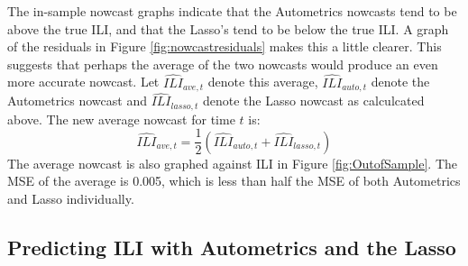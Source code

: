 The in-sample nowcast graphs indicate that the Autometrics nowcasts tend to be above the true ILI, and that the Lasso's tend to be below the true ILI. A graph of the residuals in Figure \ref{fig:nowcastresiduals} makes this a little clearer. This suggests that perhaps the average of the two nowcasts would produce an even more accurate nowcast. Let $\widehat{ILI}_{ave, t}$ denote this average, $\widehat{ILI}_{auto, t}$ denote the Autometrics nowcast and $\widehat{ILI}_{lasso, t}$ denote the Lasso nowcast as calculcated above. The new average nowcast for time $t$ is:
$$\widehat{ILI}_{ave, t} = \frac{1}{2}(\widehat{ILI}_{auto, t} + \widehat{ILI}_{lasso, t})$$
The average nowcast is also graphed against ILI in Figure \ref{fig:OutofSample}. The MSE of the average is 0.005, which is less than half the MSE of both Autometrics and Lasso individually.  


\subsection{Predicting ILI with Autometrics and the Lasso}

